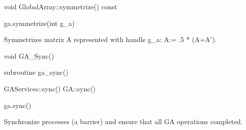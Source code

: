 \documentclass[12pt]{article}
\begin{document}
\begin{cxxapi}
\begin{cxxcode}
void GlobalArray::symmetrize() const
\end{cxxcode}
\end{cxxapi}

\begin{pyapi}
\begin{pycode}
ga.symmetrize(int g_a)
\end{pycode}
\begin{funcargs}
\end{funcargs}
\end{pyapi}

\gcoll

\begin{desc}
Symmetrizes matrix A represented with handle g_a: A:= .5 * (A+A').
\end{desc}


\begin{capi}
\begin{ccode}
void GA_Sync()
\end{ccode}
\end{capi}

\begin{fapi}
\begin{fcode}
subroutine ga_sync()
\end{fcode}
\end{fapi}

\begin{cxxapi}
\begin{cxxcode}
GAServices::sync()
GA::sync()
\end{cxxcode}
\end{cxxapi}

\begin{pyapi}
\begin{pycode}
ga.sync()
\end{pycode}
\end{pyapi}

\dcoll

\begin{desc}

Synchronize processes (a barrier) and ensure that all GA operations completed.

\end{desc}

\end{document}
